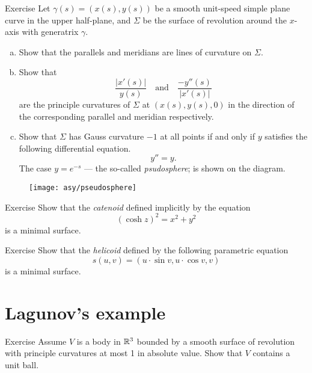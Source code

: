 \begin{thm}{Exercise}\label{ex:principle-revolution}
Let $\gamma(s)=(x(s),y(s))$ be a smooth unit-speed simple plane curve in the upper half-plane,
and  $\Sigma$ be the surface of revolution around the $x$-axis with generatrix $\gamma$.

\begin{enumerate}[(a)]
\item Show that the parallels and meridians are lines of curvature on $\Sigma$.
\item Show that 
\[\frac{|x'(s)|}{y(s)}
\quad
\text{and}
\quad
\frac{-y''(s)}{|x'(s)|}
\]
are the principle curvatures of $\Sigma$ at $(x(s),y(s),0)$ in the direction of the corresponding parallel and meridian respectively.
\item Show that $\Sigma$ has Gauss curvature $-1$ at all points if and only if $y$ satisfies the following differential equation.
\[y''=y.\] 
The case  $y=e^{-s}$ --- the so-called \emph{psudosphere}; is shown on the diagram.
\end{enumerate}

\end{thm}

\begin{figure}[h!]
\vskip-7mm
\hskip20mm
\texttt{[image: asy/pseudosphere]}
\vskip-3mm
\end{figure}

\begin{thm}{Exercise}\label{ex:catenoid-is-minimal}
Show that the \emph{catenoid} defined implicitly by the equation
\[(\cosh z)^2=x^2+y^2\]
is a minimal surface.
\end{thm}

\begin{thm}{Exercise}\label{ex:helicoid-is-minimal}
Show that the \emph{helicoid} defined by the following parametric equation
\[s(u,v)=(u\cdot \sin v,u\cdot \cos v,v)\]
is a minimal surface.
\end{thm}

\section{Lagunov's example}

\begin{thm}{Exercise}\label{ex:moon-revolution}
Assume $V$ is a body in $\mathbb{R}^3$ bounded by a smooth surface of revolution with principle curvatures at most 1 in absolute value.
Show that $V$ contains a unit ball.
\end{thm}

